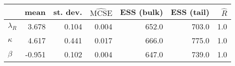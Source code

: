 \begin{tabular}{lrrrrrr}
\toprule
{} &   mean &  st. dev. &  $\widehat{\mathrm{MCSE}}$ &  ESS (bulk) &  ESS (tail) &  $\widehat{R}$ \\
\midrule
$\lambda_{R}$ &  3.678 &     0.104 &                      0.004 &       652.0 &       703.0 &            1.0 \\
$\kappa$      &  4.617 &     0.441 &                      0.017 &       666.0 &       775.0 &            1.0 \\
$\beta$       & -0.951 &     0.102 &                      0.004 &       647.0 &       739.0 &            1.0 \\
\bottomrule
\end{tabular}
